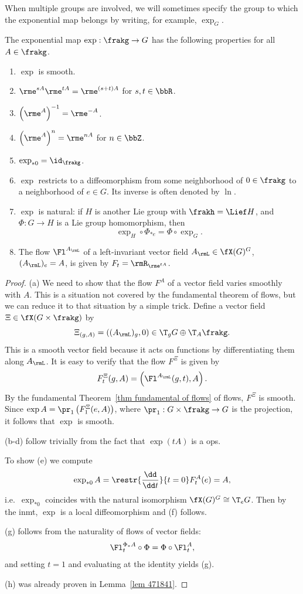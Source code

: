 When multiple groups are involved, we will sometimes specify the group to which the exponential map belongs by writing, for example, $\exp_G$.

\begin{prop}\label{prop properties of exp} The exponential map $\exp:\frakg\to G$ has the following properties for all $A\in\frakg$.
\begin{enumerate}[label=(\alph*)]
    \item $\exp$ is smooth.
    \item $\rme^{sA}\rme^{tA}=\rme^{(s+t)A}$ for $s,t\in\bbR$.
    \item $\left(\rme^A\right)^{-1}=\rme^{-A}$.
    \item $\left(\rme^A\right)^{n}=\rme^{nA}$ for $n\in \bbZ$.
    \item $\exp_{\ast 0}=\id_\frakg$.
    \item $\exp$ restricts to a diffeomorphism from some neighborhood of $0\in \frakg$ to a neighborhood of $e\in G$. Its inverse is often denoted by $\ln$.
    \item $\exp$ is natural: if $H$ is another Lie group with $\frakh=\Lief H$, and $\Phi:G\to H$ is a Lie group homomorphism, then 
    \[\exp_H\circ\Phi_{\ast e}=\Phi\circ \exp_G.\]
    \item The flow $\Fl^{A_\rmL}$ of a left-invariant vector field $A_\rmL\in \fX(G)^G$, $(A_\rmL)_e=A$, is given by $F_t=\rmR_{\rme^{tA}}$.
\end{enumerate}
\end{prop}
\begin{proof}
    (a) We need to show that the flow $F^A$ of a vector field varies smoothly with $A$. This is a situation not covered by the fundamental theorem of flows, but we can reduce it to that situation by a simple trick. Define a vector field $\Xi\in\fX(G\times\frakg)$ by
    \[\Xi_{(g,A)}=((A_\rmL)_g,0)\in \T_gG\oplus \T_A \frakg.\]
    This is a smooth vector field because it acts on functions by differentiating them along $A_\rmL$. It is easy to verify that the flow $F^\Xi$ is given by
    \[F^\Xi_t(g,A)=\left(\Fl^{A_\rmL}(g,t),A\right).\]
    By the fundamental Theorem~\ref{thm fundamental of flows} of flows, $F^\Xi$ is smooth. Since $\exp A=\pr_1\left(F^\Xi_1(e,A)\right)$, where $\pr_1:G\times\frakg\to G$ is the projection, it follows that $\exp$ is smooth.

    (b-d) follow trivially from the fact that $\exp(tA)$ is a \gls{ops}.
    
    To show (e) we compute
    \[\exp_{\ast 0}A=\restr{\frac{\dd}{\dd t}}{t=0}F_t^{A}(e)=A,\]
    i.e.~$\exp_{\ast 0}$ coincides with the natural isomorphism $\fX(G)^G\cong \T_e G$. Then by the \gls{inmt}, $\exp$ is a local diffeomorphism and (f) follows.

    (g) follows from the naturality of flows of vector fields:
    \[\Fl^{\Phi_\ast A}_t\circ \Phi=\Phi\circ \Fl^{A}_t,\]
    and setting $t=1$ and evaluating at the identity yields (g).

    (h) was already proven in Lemma~\ref{lem 471841}.
\end{proof}

